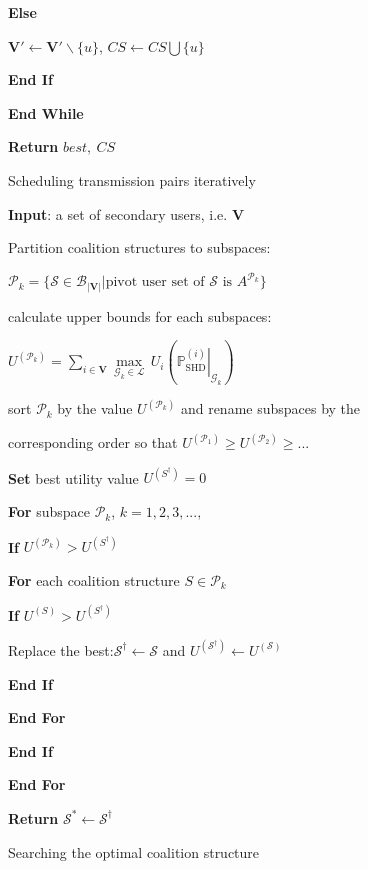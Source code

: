 \begin{algorithm}[t]
\algline \textbf{\quad{}}\textbf{\quad{}Else }

\algline \textbf{\quad{}}\textbf{\quad{}}\textbf{\quad{}} $\mathbf{V'}\leftarrow \mathbf{V'}\backslash \{u\}$, $CS \leftarrow CS \bigcup \{u\}$

\algline \textbf{\quad{}}\textbf{\quad{}End If }

\algline \textbf{\quad{}End While}

\algline \textbf{Return} $best,\medspace CS$

\caption{\label{alg_} Scheduling transmission pairs iteratively}
\end{algorithm}


\begin{algorithm}[t]
\setcounter{lines}{0}

\algline \textbf{Input}: a set of secondary users, i.e. $\mathbf{V}$

\algline Partition coalition structures to subspaces:

\textbf{\quad{}\quad{}}$\mathcal{P}_k=\{{\mathcal{S}\in\mathcal{B}_{|\mathbf{V}|}}|\text{pivot user set of }\mathcal{S}\text{ is }A^{\mathcal{P}_k}\}$

\algline calculate upper bounds for each subspaces:

\textbf{\quad{}\quad{}}$U^{(\mathcal{P}_k)}={\sum}_{i\in \mathbf{V}}\underset{\mathcal{G}_k \in \mathcal{L}}{\max}\, U_i(\left.\mathbb{P}_{\text{SHD}}^{(i)}\right|_{\mathcal{G}_k})$

\algline sort $\mathcal{P}_k$ by the value $U^{(\mathcal{P}_k)}$ and rename subspaces by the

\textbf{\quad{}\quad{}}corresponding order so that $U^{(\mathcal{P}_1)}\geq U^{(\mathcal{P}_2)}\geq...$

\algline \textbf{Set} best utility value $U^{(S^{\dagger})}=0$

\algline \textbf{For }subspace $\mathcal{P}_k$, $k=1,2,3,...,$

\algline \textbf{\quad{}If} $U^{(\mathcal{P}_k)}>U^{(S^{\dagger})}$

\algline \textbf{\quad{}\quad{}For} each coalition structure $S\in\mathcal{P}_{k}$

\algline \textbf{\quad{}\quad{}\quad{}If} $U^{(S)}>U^{(S^{\dagger})}$

\algline \textbf{\quad{}\quad{}\quad{}\quad{}}Replace the best:$\mathcal{S}^{\dagger}\leftarrow\mathcal{S}$\textbf{
}and\textbf{ $U^{(\mathcal{S}^{\dagger})}\leftarrow U^{(\mathcal{S})}$}

\algline \textbf{\quad{}\quad{}\quad{}End If}

\algline \textbf{\quad{}\quad{}End For}

\algline \textbf{\quad{}End If}

\algline \textbf{End For }

\algline \textbf{Return} $\mathcal{S}^{*}\leftarrow\mathcal{S}^{\dagger}$

\caption{\label{alg_} Searching the optimal coalition structure}
\end{algorithm}









